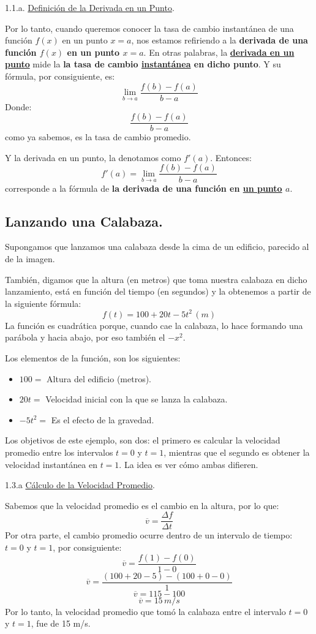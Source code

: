 \documentclass[12pt]{article}
\begin{document}
1.1.a. \underline{Definición de la Derivada en un Punto}.

Por lo tanto, cuando queremos conocer la tasa de cambio instantánea de una función $f(x)$ en un punto $x = a$, nos estamos refiriendo a la \textbf{derivada de una función $f(x)$ en un punto $x = a$}. En otras palabras, la \textbf{\underline{derivada en un punto}} mide la \textbf{la tasa de cambio \underline{instantánea} en dicho punto}. Y su fórmula, por consiguiente, es:
\[\lim_{b \to a} \frac{f(b) - f(a)}{b - a}\]
Donde:
\[\frac{f(b) - f(a)}{b - a}\]
como ya sabemos, es la tasa de cambio promedio.

Y la derivada en un punto, la denotamos como $f'(a)$. Entonces:
\[f'(a) = \lim_{b \to a} \frac{f(b) - f(a)}{b - a}\]
corresponde a la fórmula de \textbf{la derivada de una función en \underline{un punto} $a$}.



\subsection{Lanzando una Calabaza.}

Supongamos que lanzamos una calabaza desde la cima de un edificio, parecido al de la imagen.


También, digamos que la altura (en metros) que toma nuestra calabaza en dicho lanzamiento, está en función del tiempo (en segundos) y la obtenemos a partir de la siguiente fórmula:
\[f(t) = 100 + 20t - 5t^{2} \, (m)\]
La función es cuadrática porque, cuando cae la calabaza, lo hace formando una parábola y hacia abajo, por eso también el $-x^{2}$.

Los elementos de la función, son los siguientes:
\begin{itemize}
\item $100 = $ Altura del edificio (metros).
\item $20t = $ Velocidad inicial con la que se lanza la calabaza.
\item $-5t^{2} = $ Es el efecto de la gravedad.
\end{itemize}

Los objetivos de este ejemplo, son dos: el primero es calcular la velocidad promedio entre los intervalos $t = 0$ y $t = 1$, mientras que el segundo es obtener la velocidad instantánea en $t = 1$. La idea es ver cómo ambas difieren.

1.3.a \underline{Cálculo de la Velocidad Promedio}.

Sabemos que la velocidad promedio es el cambio en la altura, por lo que:
\[\overline{v} = \frac{\Delta f}{\Delta t}\]
Por otra parte, el cambio promedio ocurre dentro de un intervalo de tiempo: $t = 0$ y $t = 1$, por consiguiente:
\[\overline{v} = \frac{f(1) - f(0)}{1 - 0}\]
\[\overline{v} = \frac{(100 + 20 - 5) - (100 + 0 - 0)}{1}\]
\[\overline{v} = 115 - 100\]
\[\overline{v} = 15 \, m/s\]
Por lo tanto, la velocidad promedio que tomó la calabaza entre el intervalo $t = 0$ y $t = 1$, fue de 15 m/s.
\end{document}
